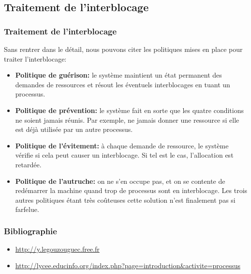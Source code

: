 \documentclass[svgnames,11pt]{beamer}
\begin{document}
\subsection{Traitement de l'interblocage}
\begin{frame}
    \frametitle{Traitement de l'interblocage}

    Sans rentrer dans le détail, nous pouvons citer les politiques mises en place pour traiter l'interblocage:
    \begin{itemize}
        \item<1-> \textbf{Politique de guérison:} le système maintient un état permanent des demandes de ressources et résout les éventuels interblocages en tuant un processus.
        \item<2-> \textbf{Politique de prévention:} le système fait en sorte que les quatre conditions ne soient jamais réunis. Par exemple, ne jamais donner une ressource si elle est déjà utilisée par un autre processus.
        \item<3-> \textbf{Politique de l'évitement:} à chaque demande de ressource, le système vérifie si cela peut causer un interblocage. Si tel est le cas, l'allocation est retardée.
        \item<4-> \textbf{Politique de l'autruche:} on ne s'en occupe pas, et on se contente de redémarrer la machine quand trop de processus sont en interblocage. Les trois autres politiques étant très coûteuses cette solution n'est finalement pas si farfelue.
    \end{itemize}

\end{frame}
\begin{frame}
    \frametitle{Bibliographie}

    \begin{itemize}
        \item \url{http://y.legouzouguec.free.fr}
        \item \url{http://lycee.educinfo.org/index.php?page=introduction&activite=processus}
    \end{itemize}

\end{frame}
\end{document}

